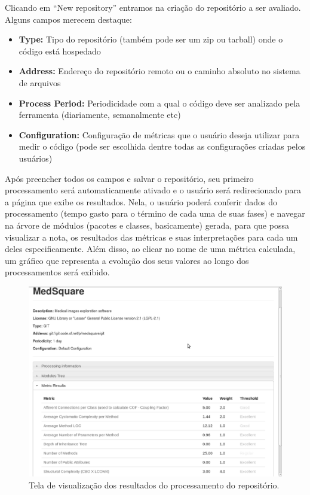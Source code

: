 \documentclass[12pt]{article}
\begin{document}
    Clicando em ``New repository'' entramos na criação do repositório a ser avaliado. Alguns campos merecem destaque:
    \begin{itemize}
      \item\textbf{Type:} Tipo do repositório (também pode ser um zip ou tarball) onde o código está hospedado
      \item\textbf{Address:} Endereço do repositório remoto ou o caminho absoluto no sistema de arquivos
      \item\textbf{Process Period:} Periodicidade com a qual o código deve ser analizado pela ferramenta (diariamente, semanalmente etc)
      \item\textbf{Configuration:} Configuração de métricas que o usuário deseja utilizar para medir o código (pode ser escolhida dentre todas as configurações criadas pelos usuários)
    \end{itemize}
    Após preencher todos os campos e salvar o repositório, seu primeiro processamento será automaticamente ativado e o usuário será redirecionado para a página que exibe os resultados. Nela, o usuário poderá conferir dados do processamento (tempo gasto para o término de cada uma de suas fases) e navegar na árvore de módulos (pacotes e classes, basicamente) gerada, para que possa visualizar a nota, os resultados das métricas e suas interpretações para cada um deles especificamente. Além disso, ao clicar no nome de uma métrica calculada, um gráfico que representa a evolução dos seus valores ao longo dos processamentos será exibido.

    \begin{figure}[H]
      \centering
      \includegraphics[scale=0.35]{images/new-repository-results.png}
      \caption{Tela de visualização dos resultados do processamento do repositório.}
      \label{fig:choose-metric}
    \end{figure}
\end{document}
